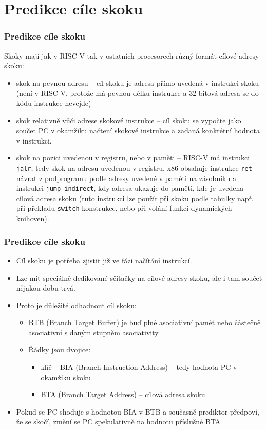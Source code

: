\documentclass{beamer}
\begin{document}
\section{Predikce cíle skoku}

\begin{frame}
\frametitle{Predikce cíle skoku}

Skoky mají jak v RISC-V tak v ostatních procesorech různý formát cílové adresy skoku:
\begin{itemize}
\item skok na pevnou adresu -- cíl skoku je adresa přímo uvedená v instrukci skoku (není v RISC-V, protože má pevnou délku instrukce a 32-bitová adresa se do kódu instrukce nevejde)
\item skok relativně vůči adrese skokové instrukce -- cíl skoku se vypočte jako součet PC v okamžiku načtení skokové instrukce a zadaná konkrétní hodnota v instrukci.
\item skok na pozici uvedenou v registru, nebo v paměti -- RISC-V má instrukci \texttt{jalr}, tedy skok na adresu uvedenou v registru, x86 obsahuje instrukce \texttt{ret} -- návrat z podprogramu podle adresy uvedené v paměti na zásobníku a instrukci \texttt{jump indirect}, kdy adresa ukazuje do paměti, kde je uvedena cílová adresa skoku (tuto instrukci lze použít při skoku podle tabulky např. při překladu \texttt{switch} konstrukce, nebo při volání funkcí dynamických knihoven). 
\end{itemize}
\end{frame}

\begin{frame}
\frametitle{Predikce cíle skoku}

\begin{itemize}
\item Cíl skoku je potřeba zjistit již ve fázi načítání instrukcí.
\item Lze mít speciálně dedikované sčítačky na cílové adresy skoku, ale i tam součet nějakou dobu trvá.
\item Proto je důležité odhadnout cíl skoku:
\begin{itemize}
\item BTB (Branch Target Buffer) je buď plně asociativní paměť nebo částečně
asociativní s daným stupněm asociativity
\item Řádky jsou dvojice: 
\begin{itemize}
\item klíč -- BIA (Branch Instruction Address) -- tedy hodnota PC v okamžiku skoku
\item BTA (Branch Target Address) -- cílová adresa skoku
\end{itemize}
\end{itemize}
\item Pokud se PC shoduje s hodnotou BIA v BTB a současně prediktor předpoví, že se skočí, změní se PC spekulativně na hodnotu příslušné BTA
\end{itemize}
\end{frame}
\end{document}
